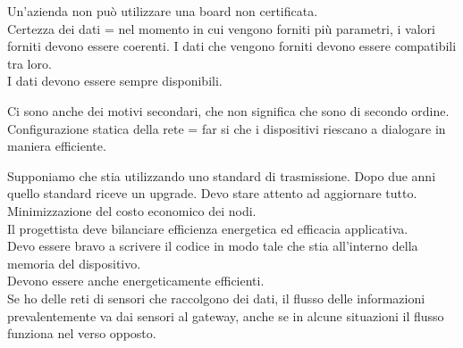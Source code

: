 \documentclass{article}
\begin{document}
    Un'azienda non può utilizzare una board non certificata.\\
    Certezza dei dati = nel momento in cui vengono forniti più parametri, i valori forniti devono essere coerenti. I dati che vengono forniti devono essere compatibili tra loro.\\
    I dati devono essere sempre disponibili.

    Ci sono anche dei motivi secondari, che non significa che sono di secondo ordine.\\
    Configurazione statica della rete = far si che i dispositivi riescano a dialogare in maniera efficiente.
    
    Supponiamo che stia utilizzando uno standard di trasmissione. Dopo due anni quello standard riceve un upgrade. Devo stare attento ad aggiornare tutto.\\
    Minimizzazione del costo economico dei nodi.\\
    Il progettista deve bilanciare efficienza energetica ed efficacia applicativa.\\
    Devo essere bravo a scrivere il codice in modo tale che stia all'interno della memoria del dispositivo.\\
    Devono essere anche energeticamente efficienti.\\
    Se ho delle reti di sensori che raccolgono dei dati, il flusso delle informazioni prevalentemente va dai sensori al gateway, anche se in alcune situazioni il flusso funziona nel verso opposto.
\end{document}
